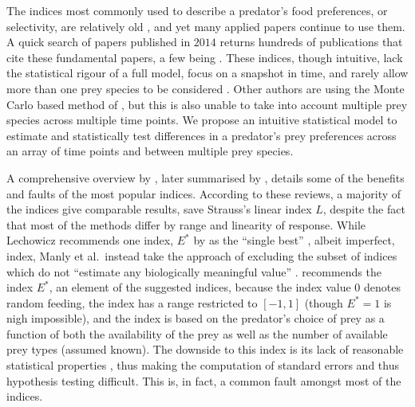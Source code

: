 \documentclass[smallextended]{svjour3}
\begin{document}
The indices most commonly used to describe a predator's food preferences, or selectivity, are relatively old \citep{Ivlev:1964,Jacobs:1974,Chesson:1978,Strauss:1979,Vanderploeg:1979,Chesson:1983}, and yet many applied papers continue to use them.  A quick search of papers published in $2014$ returns hundreds of publications that cite these fundamental papers, a few being \citet{Clements:2014,Hansen:2014,Hellstrom:2014,Lyngdoh:2014,Madduppa:2014}.  These indices, though intuitive, lack the statistical rigour of a full model, focus on a snapshot in time, and rarely allow more than one prey species to be considered \citep{Lechowicz:1982}.  Other authors are using the Monte Carlo based method of \citet{Agusti:2003} \citep[see][]{Davey:2013,King:2010}, but this is also unable to take into account multiple prey species across multiple time points.  We propose an intuitive statistical model to estimate and statistically test differences in a predator's prey preferences across an array of time points and between multiple prey species.   

A comprehensive overview by \citet{Lechowicz:1982}, later summarised by \citet{Manly:2002}, details some of the benefits and faults of the most popular indices.  According to these reviews, a majority of the indices give comparable results, save Strauss's linear index $L$, despite the fact that most of the methods differ by range and linearity of response.  While Lechowicz recommends one index, $E^*$ by \citet{Vanderploeg:1979} as the ``single best'' \citep{Lechowicz:1982}, albeit imperfect, index, Manly et al.\ instead take the approach of excluding the subset of indices which do not ``estimate any biologically meaningful value'' \citep{Manly:2002}.  \citet{Lechowicz:1982} recommends the index $E^*$, an element of the \citet{Manly:2002} suggested indices, because the index value $0$ denotes random feeding, the index has a range restricted to $[-1,1]$ (though $E^*=1$ is nigh impossible), and the index is based on the predator's choice of prey as a function of both the availability of the prey as well as the number of available prey types (assumed known).  The downside to this index is its lack of reasonable statistical properties \citep{Lechowicz:1982}, thus making the computation of standard errors and thus hypothesis testing difficult.  This is, in fact, a common fault amongst most of the indices.  
\end{document}
